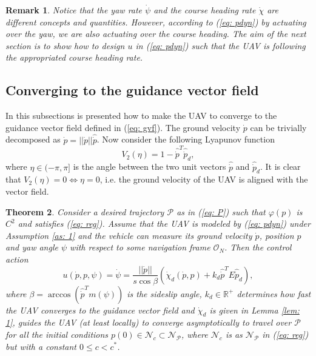\documentclass[letterpaper, 10 pt, conference]{ieeeconf}  %
\newtheorem{theorem}{\textbf{Theorem}}[section]
\newtheorem{remark}[theorem]{Remark}
\begin{document}
\begin{remark}
	Notice that the yaw rate $\dot\psi$ and the course heading rate $\dot\chi$ are different concepts and quantities. However, according to (\ref{eq: pdyn}) by actuating over the yaw, we are also actuating over the course heading. The aim of the next section is to show how to design $u$ in (\ref{eq: pdyn}) such that the UAV is following the appropriated course heading rate.
\end{remark}

\subsection{Converging to the guidance vector field}
In this subsections is presented how to make the UAV to converge to the guidance vector field defined in (\ref{eq: gvf}). The ground velocity $\dot p$ can be trivially decomposed as $\dot p = ||\dot p|| \hat{\dot p}$. Now consider the following Lyapunov function
\begin{equation}
	V_2(\eta) = 1 - \hat {\dot p}^T \hat{\dot p}_d,
	\label{eq: V2}
\end{equation}
where $\eta\in(-\pi, \pi]$ is the angle between the two unit vectors $\hat {\dot p}$ and $\hat{\dot p}_d$. It is clear that $V_2(\eta) = 0 \iff \eta = 0$, i.e. the ground velocity of the UAV is aligned with the vector field.
\begin{theorem}
	\label{th: 1}
	Consider a desired trajectory $\mathcal{P}$ as in (\ref{eq: P}) such that $\varphi(p)$ is $C^2$ and satisfies (\ref{eq: reg}). Assume that the UAV is modeled by (\ref{eq: pdyn}) under Assumption \ref{as: 1} and the vehicle can measure its ground velocity $\dot p$, position $p$ and yaw angle $\psi$ with respect to some navigation frame $\mathcal{O}_N$. Then the control action 
\begin{equation}
	u(\dot p, p, \psi) = \dot\psi = \frac{||\dot p||}{s\cos{\beta}}\left (\dot\chi_d(\dot p, p)
	+ k_d \hat{\dot p}^TE\hat{\dot p}_d\right), \label{eq: u}
\end{equation}
	where $\beta = \operatorname{arccos}\left({\hat{\dot p}^T m(\psi)}\right)$ is the \emph{sideslip} angle, $k_d\in\mathbb{R}^+$ determines how fast the UAV converges to the guidance vector field and $\dot\chi_d$ is given in Lemma \ref{lem: 1}, guides the UAV (at least locally) to converge asymptotically to travel over $\mathcal{P}$ for all the initial conditions $p(0)\in \mathcal{N}_c \subset \mathcal{N}_{\mathcal{P}}$, where $\mathcal{N}_c$ is as $\mathcal{N}_{\mathcal{P}}$ in (\ref{eq: reg}) but with a constant $0 \leq c < c^*$.
\end{theorem}
\end{document}
